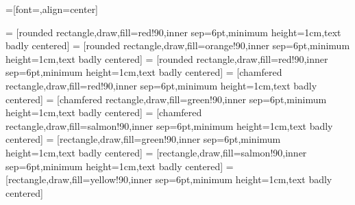 






=[font=\sffamily,align=center]

\newcommand{\fillOpacity}{90}

\newcommand{\compShape}{rectangle}
\newcommand{\groupShape}{chamfered rectangle}
\newcommand{\procShape}{rounded rectangle}

\newcommand{\explicitColor}{green}
\newcommand{\implicitColor}{salmon}
\newcommand{\optimizationColor}{red} %

 = [\procShape,draw,fill=\optimizationColor!\fillOpacity,inner sep=6pt,minimum height=1cm,text badly centered]
 = [\procShape,draw,fill=orange!\fillOpacity,inner sep=6pt,minimum height=1cm,text badly centered]
 = [\procShape,draw,fill=\optimizationColor!\fillOpacity,inner sep=6pt,minimum height=1cm,text badly centered]
 = [\groupShape,draw,fill=\optimizationColor!\fillOpacity,inner sep=6pt,minimum height=1cm,text badly centered]
 = [\groupShape,draw,fill=\explicitColor!\fillOpacity,inner sep=6pt,minimum height=1cm,text badly centered]
 = [\groupShape,draw,fill=\implicitColor!\fillOpacity,inner sep=6pt,minimum height=1cm,text badly centered]
 = [\compShape,draw,fill=\explicitColor!\fillOpacity,inner sep=6pt,minimum height=1cm,text badly centered]
 = [\compShape,draw,fill=\implicitColor!\fillOpacity,inner sep=6pt,minimum height=1cm,text badly centered]
 = [\compShape,draw,fill=yellow!\fillOpacity,inner sep=6pt,minimum height=1cm,text badly centered]

